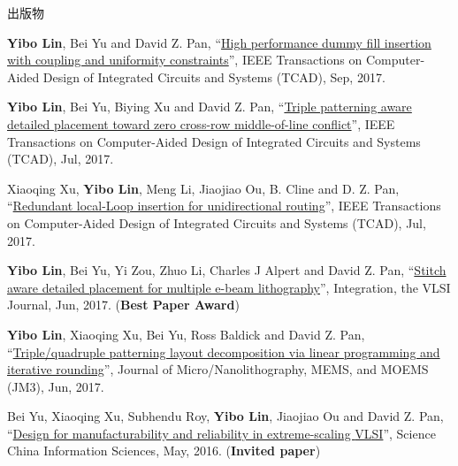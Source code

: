 \begin{rSection}{出版物}
\begin{description}[font=\normalfont, rightmargin=2em]
{}
            

\item[{[J7]}]{
        \textbf{Yibo Lin}, Bei Yu and David Z. Pan, 
    ``\href{http://dx.doi.org/10.1109/TCAD.2016.2638452}{High performance dummy fill insertion with coupling and uniformity constraints}'', 
    IEEE Transactions on Computer-Aided Design of Integrated Circuits and Systems (TCAD), Sep, 2017.
    
}
            

\item[{[J6]}]{
        \textbf{Yibo Lin}, Bei Yu, Biying Xu and David Z. Pan, 
    ``\href{http://dx.doi.org/10.1109/TCAD.2017.2648843}{Triple patterning aware detailed placement toward zero cross-row middle-of-line conflict}'', 
    IEEE Transactions on Computer-Aided Design of Integrated Circuits and Systems (TCAD), Jul, 2017.
    
}
            

\item[{[J5]}]{
        Xiaoqing Xu, \textbf{Yibo Lin}, Meng Li, Jiaojiao Ou,  B. Cline  and  D. Z. Pan, 
    ``\href{http://dx.doi.org/10.1109/TCAD.2017.2651811}{Redundant local-Loop insertion for unidirectional routing}'', 
    IEEE Transactions on Computer-Aided Design of Integrated Circuits and Systems (TCAD), Jul, 2017.
    
}
            

\item[{[J4]}]{
        \textbf{Yibo Lin}, Bei Yu, Yi Zou, Zhuo Li, Charles J Alpert and David Z. Pan, 
    ``\href{http://dx.doi.org/10.1016/j.vlsi.2017.02.004}{Stitch aware detailed placement for multiple e-beam lithography}'', 
    Integration, the VLSI Journal, Jun, 2017.
    (\textbf{Best Paper Award})
}
            

\item[{[J3]}]{
        \textbf{Yibo Lin}, Xiaoqing Xu, Bei Yu, Ross Baldick and David Z. Pan, 
    ``\href{http://dx.doi.org/10.1117/1.JMM.16.2.023507}{Triple/quadruple patterning layout decomposition via linear programming and iterative rounding}'', 
    Journal of Micro/Nanolithography, MEMS, and MOEMS (JM3), Jun, 2017.
    
}
            

\item[{[J2]}]{
        Bei Yu, Xiaoqing Xu, Subhendu Roy, \textbf{Yibo Lin}, Jiaojiao Ou and David Z. Pan, 
    ``\href{http://link.springer.com/article/10.1007%2Fs11432-016-5560-6}{Design for manufacturability and reliability in extreme-scaling {VLSI}}'', 
    Science China Information Sciences, May, 2016.
    (\textbf{Invited paper})
}
            


\end{description}
\end{rSection}
